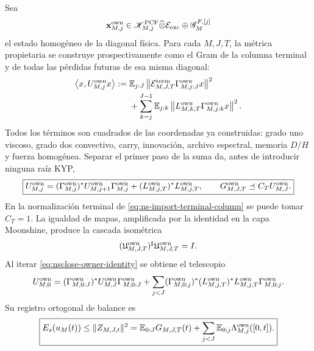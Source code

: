 Sea
\[
 \mathbf x_{M,j}^{\rm own}
 \in\mathscr K_{M,j}^{\rm PCF}
 \widehat\otimes\mathcal E_{\rm exc}
 \oplus\mathscr G_M^{F,[j]}
\]
el estado homogéneo de la diagonal física. Para cada \(M,J,T\), la métrica
propietaria se construye prospectivamente como el Gram de la columna
terminal y de todas las pérdidas futuras de esa misma diagonal:
\begin{equation}
 \begin{aligned}
 \left\langle x,U_{M,j}^{\rm own}x\right\rangle
 :={}&
 \mathbb E_{j:J}
 \left\|\mathcal E_{M,J,T}^{\rm term}
       \Gamma_{M,j:J}^{\rm own}x\right\|^2\\
 &+\sum_{k=j}^{J-1}\mathbb E_{j:k}
 \left\|L_{M,k,T}^{\rm own}
       \Gamma_{M,j:k}^{\rm own}x\right\|^2 .
 \end{aligned}
 \label{eq:nsclose-owner-metric-definition}
\end{equation}
Todos los términos son cuadrados de las coordenadas ya construidas: grado
uno viscoso, grado dos convectivo, carry, innovación, archivo espectral,
memoria \(D/H\) y fuerza homogénea. Separar el primer paso de la suma da,
antes de introducir ninguna raíz KYP,
\begin{equation}
 \boxed{
 U_{M,j}^{\rm own}
 =
 (\Gamma_{M,j}^{\rm own})^*
 U_{M,j+1}^{\rm own}\Gamma_{M,j}^{\rm own}
 +(L_{M,j,T}^{\rm own})^*L_{M,j,T}^{\rm own},
 \qquad
 G_{M,J,T}^{\rm own}\preceq C_TU_{M,J}^{\rm own}.}
 \label{eq:nsclose-proprietary-terminal-gate}
\end{equation}
\label{eq:nsclose-owner-identity}
En la normalización terminal de \eqref{eq:ns-import-terminal-column} se puede
tomar \(C_T=1\). La igualdad de mapas, amplificada por la identidad en la capa
Moonshine, produce la cascada isométrica
\begin{equation}
 (\mathfrak U_{M,J,T}^{\rm own})^{\sharp}
 \mathfrak U_{M,J,T}^{\rm own}=I.
 \label{eq:nsclose-proprietary-full-cascade}
\end{equation}
Al iterar \eqref{eq:nsclose-owner-identity} se obtiene el telescopio
\begin{equation}
 U_{M,0}^{\rm own}
 =
 (\Gamma_{M,0:J}^{\rm own})^*U_{M,J}^{\rm own}
  \Gamma_{M,0:J}^{\rm own}
 +\sum_{j<J}(\Gamma_{M,0:j}^{\rm own})^*
  (L_{M,j,T}^{\rm own})^*L_{M,j,T}^{\rm own}
  \Gamma_{M,0:j}^{\rm own}.
 \label{eq:nsclose-owner-telescope}
\end{equation}
Su registro ortogonal de balance es
\begin{equation}
 \boxed{
 E_s(u_M(t))\le\|Z_{M,J,t}\|^2
 =\mathbb E_{0:J}G_{M,J,T}(t)
 +\sum_{j<J}\mathbb E_{0:j}
   \Lambda_{M,j}^{\rm own}([0,t]).}
 \label{eq:nsclose-proprietary-ledger}
\end{equation}
